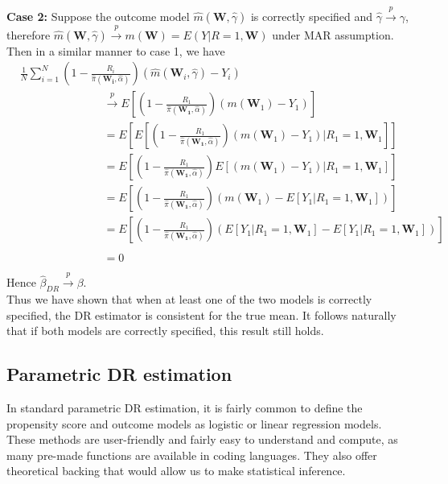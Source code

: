 \documentclass[12pt,twoside]{article}
\begin{document}
\textbf{Case 2:} Suppose the outcome model $\hat m(\mathbf{W}, \hat\gamma)$ is correctly specified and $\hat{\gamma} \xrightarrow{p} \gamma$, therefore  $\hat m(\mathbf{W}, \hat\gamma) \xrightarrow{p} m(\mathbf{W}) = E(Y|R = 1,\mathbf{W})$ under MAR assumption. Then in a similar manner to case 1, we have
\begin{align*}
& \frac{1}{N}\sum_{i=1}^{N}\left(1 - \frac{R_i}{\hat\pi(\mathbf{W_i},\hat{\alpha})} \right) (\hat m(\mathbf{W}_i, \hat\gamma)-Y_i) \\
     & \phantom{E [(1 - \frac{R_1}{\pi(\mathbf{W_1})})} \xrightarrow{p} E\left[\left(1 - \frac{R_1}{\hat\pi(\mathbf{W_1},\hat{\alpha})} \right) (m(\mathbf{W}_1)-Y_1)\right]  \\
     & \phantom{E [(1 - \frac{R_1}{\pi(\mathbf{W_1})})} = E\left[ E\left[\left(1 - \frac{R_1}{\hat\pi(\mathbf{W_1},\hat{\alpha})} \right)(m(\mathbf{W}_1)-Y_1)|R_1 = 1, \mathbf{W}_1\right]\right] \\
     & \phantom{E [(1 - \frac{R_1}{\pi(\mathbf{W_1})})} = E\left[\left(1 - \frac{R_1}{\hat\pi(\mathbf{W_1},\hat{\alpha})} \right) E\left[(m(\mathbf{W}_1)-Y_1)|R_1 = 1, \mathbf{W}_1\right]\right] \\
     & \phantom{E [(1 - \frac{R_1}{\pi(\mathbf{W_1})})} = E\left[\left(1 - \frac{R_1}{\hat\pi(\mathbf{W_1},\hat{\alpha})} \right) (m(\mathbf{W}_1)-E\left[Y_1|R_1 = 1, \mathbf{W}_1\right])\right] \\
     & \phantom{E [(1 - \frac{R_1}{\pi(\mathbf{W_1})})} = E\left[\left(1 - \frac{R_1}{\hat\pi(\mathbf{W_1},\hat{\alpha})} \right) (E\left[Y_1|R_1=1, \mathbf{W}_1\right]-E\left[Y_1|R_1=1, \mathbf{W}_1\right])\right] \\
     & \phantom{E [(1 - \frac{R_1}{\pi(\mathbf{W_1})})} = 0
\end{align*}
Hence $\hat{\beta}_{DR} \xrightarrow{p} \beta$.\\

Thus we have shown that when at least one of the two models is correctly specified, the DR estimator is consistent for the true mean. It follows naturally that if both models are correctly specified, this result still holds.\\

\subsection{Parametric DR estimation}

In standard parametric DR estimation, it is fairly common to define the propensity score and outcome models as logistic or linear regression models. These methods are user-friendly and fairly easy to understand and compute, as many pre-made functions are available in coding languages. They also offer theoretical backing that would allow us to make statistical inference.\\
\end{document}
